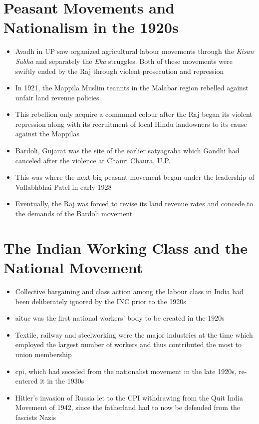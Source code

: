 \section{Peasant Movements and Nationalism in the 1920s}
\begin{itemize}
    \item Avadh in UP saw organized agricultural labour movements through the \textit{Kisan Sabha} and separately the \textit{Eka} struggles. Both of these movements were swiftly ended by the Raj through violent prosecution and repression
    \item In 1921, the Mappila Muslim teannts in the Malabar region rebelled against unfair land revenue policies.
    \item This rebellion only acquire a communal colour after the Raj began its violent repression along with its recruitment of local Hindu landowners to its cause against the Mappilas
    \item Bardoli, Gujarat was the site of the earlier satyagraha which Gandhi had canceled after the violence at Chauri Chaura, U.P.
    \item This was where the next big peasant movement began under the leadership of Vallabhbhai Patel in early 1928
    \item Eventually, the Raj was forced to revise its land revenue rates and concede to the demands of the Bardoli movement
\end{itemize}

\section{The Indian Working Class and the National Movement}
\begin{itemize}
    \item Collective bargaining and class action among the labour class in India had been deliberately ignored by the INC prior to the 1920s
    \item \acrshort{aituc} was the first national workers' body to be created in the 1920s
    \item Textile, railway and steelworking were the major industries at the time which employed the largest number of workers and thus contributed the most to union membership
    \item \acrshort{cpi}, which had seceded from the nationalist movement in the late 1920s, re-entered it in the 1930s
    \item Hitler's invasion of Russia let to the CPI withdrawing from the Quit India Movement of 1942, since the fatherland had to now be defended from the fascists Nazis
\end{itemize}


